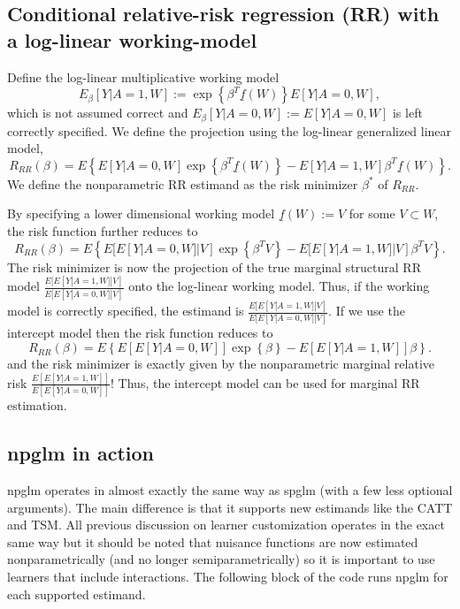 \documentclass[article]{jss}
\begin{document}
\subsection{Conditional relative-risk regression (RR) with a log-linear working-model}
Define the log-linear multiplicative working model
$$E_{\beta}[Y|A=1,W] := \exp\left\{\beta^T \underline{f}(W) \right\}E[Y|A=0,W],$$
which is not assumed correct and $E_{\beta}[Y|A=0,W] := E[Y|A=0,W]$ is left correctly specified. We define the projection using the log-linear generalized linear model,
$$R_{RR}(\beta) = E \left\{E[Y|A=0,W] \exp\left\{ \beta^T \underline{f}(W)\right\}  -  E[Y|A=1,W]  \beta^T \underline{f}(W)\right\}.$$
We define the nonparametric RR estimand as the risk minimizer $\beta^*$ of $R_{RR}$. 

By specifying a lower dimensional working model $\underline{f}(W) := V$ for some $V \subset W$, the risk function further reduces to
$$R_{RR}(\beta) = E \left\{E[E[Y|A=0,W]|V] \exp\left\{ \beta^T V\right\}  -  E[E[Y|A=1,W]|V]  \beta^T V\right\}.$$
The risk minimizer is now the projection of the true marginal structural RR model $\frac{E[E[Y|A=1,W]|V]}{E[E[Y|A=0,W]|V]}$ onto the log-linear working model. Thus, if the working model is correctly specified, the estimand is $\frac{E[E[Y|A=1,W]|V]}{E[E[Y|A=0,W]|V]}$. If we use the intercept model then the risk function reduces to
$$R_{RR}(\beta) = E \left\{E[E[Y|A=0,W]] \exp\left\{ \beta \right\}  -  E[E[Y|A=1,W]]  \beta\right\}.$$
and the risk minimizer is exactly given by the nonparametric marginal relative risk $\frac{E[E[Y|A=1,W]]}{E[E[Y|A=0,W]]}$! Thus, the intercept model can be used for marginal RR estimation.


\subsection{npglm in action}
npglm operates in almost exactly the same way as spglm (with a few less optional arguments). The main difference is that it supports new estimands like the CATT and TSM. All previous discussion on learner customization operates in the exact same way but it should be noted that nuisance functions are now estimated nonparametrically (and no longer semiparametrically) so it is important to use learners that include interactions. The following block of the code runs npglm for each supported estimand.
\end{document}
